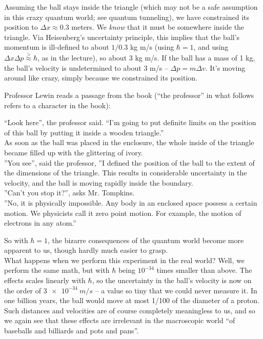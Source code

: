 Assuming the ball stays inside the triangle (which may not be a safe assumption in this crazy quantum world; see quantum tunneling), we have constrained its position to $\Delta x \approx 0.3$ meters. We \emph{know} that it must be somewhere inside the triangle. Via Heisenberg's uncertainty principle, this implies that the ball's momentum is ill-defined to about $1/0.3$ kg m/s (using $\hbar = 1$, and using $\Delta x \Delta p \overset{>}{\approx} \hbar$, as in the lecture), so about 3 kg m/s. If the ball has a mass of 1 kg, the ball's velocity is undetermined to about 3 m/s -- $\Delta p = m \Delta v$. It's moving around like crazy, simply because we constrained its position.

Professor Lewin reads a passage from the book (``the professor'' in what follows refers to a character in the book):

``Look here'', the professor said. ``I'm going to put definite limits on the position of this ball by putting it inside a wooden triangle.''\\
As soon as the ball was placed in the enclosure, the whole inside of the triangle became filled up with the glittering of ivory.\\
''You see'', said the professor, ''I defined the position of the ball to the extent of the dimensions of the triangle. This results in considerable uncertainty in the velocity, and the ball is moving rapidly inside the boundary.\\
''Can't you stop it?'', asks Mr. Tompkins.\\
''No, it is physically impossible. Any body in an enclosed space possess a certain motion. We physicists call it zero point motion. For example, the motion of electrons in any atom.''

So with $\hbar = 1$, the bizarre consequences of the quantum world become more apparent to us, though hardly much easier to grasp.\\
What happens when we perform this experiment in the real world? Well, we perform the same math, but with $\hbar$ being $10^{-34}$ times smaller than above. The effects scales linearly with $\hbar$, so the uncertainty in the ball's velocity is now on the order of $\SI{3e-34}{m/s}$ -- a value so tiny that we could never measure it. In one billion years, the ball would move at most 1/100 of the diameter of a proton. Such distances and velocities are of course completely meaningless to us, and so we again see that these effects are irrelevant in the macroscopic world ``of baseballs and billiards and pots and pans''.


